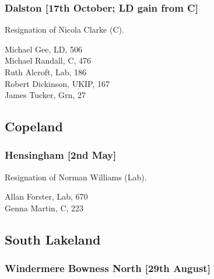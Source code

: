 \documentclass[a4paper,openany,10pt]{book}
\begin{document}
\subsubsection*{Dalston \hspace*{\fill}\nolinebreak[1]%
\enspace\hspace*{\fill}
[17th October; LD gain from C]}


Resignation of Nicola Clarke (C).



Michael Gee, LD, 506\\
Michael Randall, C, 476\\
Ruth Alcroft, Lab, 186\\
Robert Dickinson, UKIP, 167\\
James Tucker, Grn, 27\\


\subsection*{Copeland}

\subsubsection*{Hensingham \hspace*{\fill}\nolinebreak[1]%
\enspace\hspace*{\fill}
[2nd May]}


Resignation of Norman Williams (Lab).



Allan Forster, Lab, 670\\
Genna Martin, C, 223\\


\subsection*{South Lakeland}

\subsubsection*{Windermere Bowness North \hspace*{\fill}\nolinebreak[1]%
\enspace\hspace*{\fill}
[29th August]}
\end{document}
